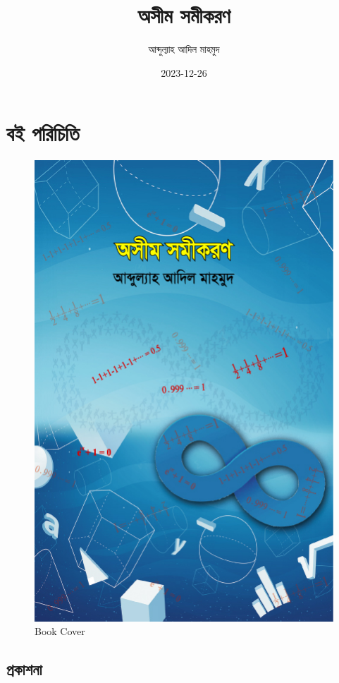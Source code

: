 \documentclass[
]{book}
\title{অসীম সমীকরণ}
\author{আব্দুল্যাহ আদিল মাহমুদ}
\date{2023-12-26}
\begin{document}
\maketitle

{
\setcounter{tocdepth}{1}
\tableofcontents
}
\hypertarget{ux9acux987-ux9aaux9b0ux99aux9a4}{%
\chapter*{বই পরিচিতি}\label{ux9acux987-ux9aaux9b0ux99aux9a4}}

\begin{figure}

{\centering \includegraphics[width=0.8\linewidth]{os_cover} 

}

\caption{Book Cover}\label{fig:cover}
\end{figure}

\hypertarget{ux9aaux9b0ux995ux9b6ux9a8}{%
\section{প্রকাশনা}\label{ux9aaux9b0ux995ux9b6ux9a8}}
\end{document}
